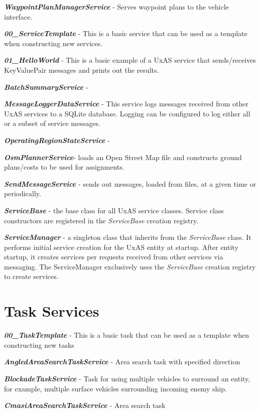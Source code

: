 \textbf{\emph{WaypointPlanManagerService}} - Serves waypoint plans to
the vehicle interface.

\textbf{\emph{00\_ServiceTemplate}} - This is a basic service that can
be used as a template when constructing new services.

\textbf{\emph{01\_HelloWorld}} - This is a basic example of a UxAS
service that sends/receives KeyValuePair messages and prints out the
results.

\textbf{\emph{BatchSummaryService}} -

\textbf{\emph{MessageLoggerDataService}} - This service logs messages
received from other UxAS services to a SQLite database. Logging can be
configured to log either all or a subset of service messages.

\textbf{\emph{OperatingRegionStateService}} -

\textbf{\emph{OsmPlannerService}}- loads an Open Street Map file and
constructs ground plans/costs to be used for assignments.

\textbf{\emph{SendMessageService}} - sends out messages, loaded from
files, at a given time or periodically.

\textbf{\emph{ServiceBase}} - the base class for all UxAS service
classes. Service class constructors are registered in the
\emph{ServiceBase} creation registry.

\textbf{\emph{ServiceManager}} - a singleton class that inherits from
the \emph{ServiceBase} class. It performs initial service creation for
the UxAS entity at startup. After entity startup, it creates services
per requests received from other services via messaging. The
ServiceManager exclusively uses the \emph{ServiceBase} creation registry
to create services.

\section{Task Services}\label{task-services}

\textbf{\emph{00\_TaskTemplate}} - This is a basic task that can be used
as a template when constructing new tasks

\textbf{\emph{AngledAreaSearchTaskService}} - Area search task with
specified direction

\textbf{\emph{BlockadeTaskService}} - Task for using multiple vehicles
to surround an entity, for example, multiple surface vehicles
surrounding incoming enemy ship.

\textbf{\emph{CmasiAreaSearchTaskService}} - Area search task

